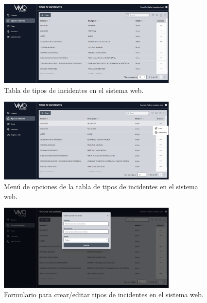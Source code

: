 \begin{figure}[H]
    \centering
    \includegraphics[width=0.8\textwidth]{chapters/III-resultados-y-discusion/resources/images/tabla-tipos-incidentes-web.png}
    \caption{Tabla de tipos de incidentes en el sistema web.}
    \label{fig:tabla-tipos-incidentes-web}
\end{figure}

\begin{figure}[H]
    \centering
    \includegraphics[width=0.8\textwidth]{chapters/III-resultados-y-discusion/resources/images/menu-tabla-tipos-incidentes-web.png}
    \caption{Menú de opciones de la tabla de tipos de incidentes en el sistema web.}
    \label{fig:menu-tabla-tipos-incidentes-web}
\end{figure}

\begin{figure}[H]
    \centering
    \includegraphics[width=0.8\textwidth]{chapters/III-resultados-y-discusion/resources/images/formulario-tipo-incidente-web.png}
    \caption{Formulario para crear/editar tipos de incidentes en el sistema web.}
    \label{fig:formulario-tipo-incidente-web}
\end{figure}

